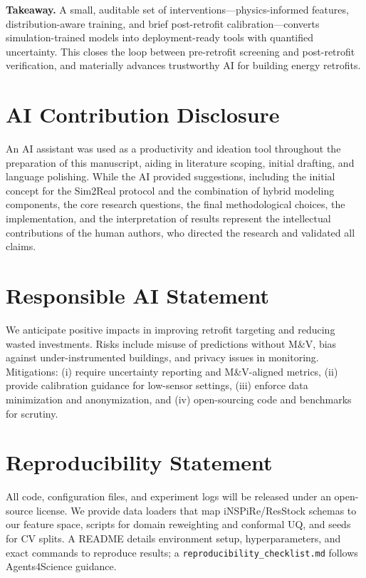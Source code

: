 ﻿\documentclass{article}
\begin{document}
\noindent\textbf{Takeaway.} A small, auditable set of interventions—physics-informed features, distribution-aware training, and brief post-retrofit calibration—converts simulation-trained models into deployment-ready tools with quantified uncertainty. This closes the loop between pre-retrofit screening and post-retrofit verification, and materially advances trustworthy AI for building energy retrofits.



\section*{AI Contribution Disclosure}
An AI assistant was used as a productivity and ideation tool throughout the preparation of this manuscript, aiding in literature scoping, initial drafting, and language polishing. While the AI provided suggestions, including the initial concept for the Sim2Real protocol and the combination of hybrid modeling components, the core research questions, the final methodological choices, the implementation, and the interpretation of results represent the intellectual contributions of the human authors, who directed the research and validated all claims.

\section*{Responsible AI Statement}
We anticipate positive impacts in improving retrofit targeting and reducing wasted investments.
Risks include misuse of predictions without M\&V, bias against under-instrumented buildings, and privacy issues in monitoring.
Mitigations: (i) require uncertainty reporting and M\&V-aligned metrics, (ii) provide calibration guidance for low-sensor settings, (iii) enforce data minimization and anonymization, and (iv) open-sourcing code and benchmarks for scrutiny.

\section*{Reproducibility Statement}
All code, configuration files, and experiment logs will be released under an open-source license.
We provide data loaders that map iNSPiRe/ResStock schemas to our feature space, scripts for domain reweighting and conformal UQ, and seeds for CV splits.
A README details environment setup, hyperparameters, and exact commands to reproduce results; a \texttt{reproducibility\_checklist.md} follows Agents4Science guidance.



\end{document}
